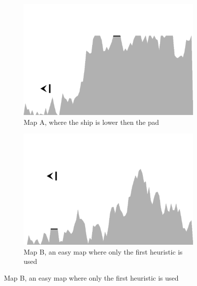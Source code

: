 \documentclass[conference]{IEEEtran}
\begin{document}
       




\begin{figure}[ht]
  \centering



  \centering
        \begin{subfigure}{0.49\textwidth}
                \centering
                \includegraphics[width=1.0\textwidth]{./graphics/map2.pdf}
                \caption{Map A,  where the ship is lower then the pad}
                \label{fig:map2}
        \end{subfigure}  
        \begin{subfigure}{0.49\textwidth}
                \centering
                \includegraphics[width=1.0\textwidth]{./graphics/map1-easy.pdf}
                \caption{Map B, an easy map where only the first heuristic is used}
                \label{fig:map1-easy}


\end{subfigure}
\end{figure}
\end{document}
